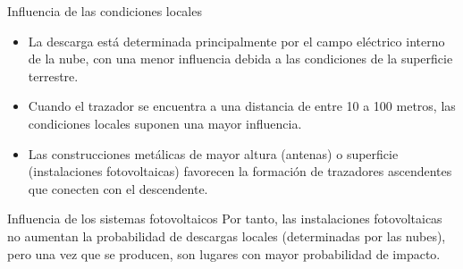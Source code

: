 \documentclass[xcolor={usenames,svgnames,dvipsnames}]{beamer}
\begin{document}
\begin{frame}[label=sec-4-1-4]{Influencia de las condiciones locales}
\begin{itemize}
\item La descarga está determinada principalmente por el campo eléctrico
interno de la nube, con una menor influencia debida a las condiciones
de la superficie terrestre.

\item Cuando el trazador se encuentra a una distancia de entre 10 a 100
metros, las condiciones locales suponen una mayor influencia.

\item Las construcciones metálicas de mayor altura (antenas) o superficie
(instalaciones fotovoltaicas) favorecen la formación de trazadores
ascendentes que conecten con el descendente.
\end{itemize}
\end{frame}

\begin{frame}[label=sec-4-1-5]{Influencia de los sistemas fotovoltaicos}
Por tanto, \alert{las instalaciones fotovoltaicas no aumentan la probabilidad
de descargas locales} (determinadas por las nubes), pero una vez que se
producen, son lugares con mayor probabilidad de impacto.
\end{frame}
\end{document}
